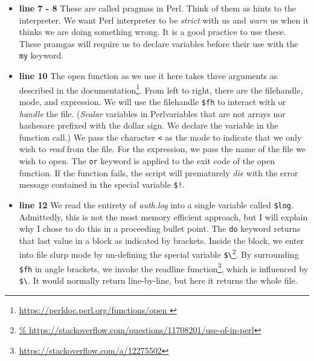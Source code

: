 \documentclass{article}
\begin{document}
\begin{itemize}[leftmargin=*]

	\item

		\textbf{line 7 - 8} These are called pragmas in Perl. Think of
		them as hints to the interpreter. We want Perl interpreter to be
		\emph{strict} with us and \emph{warn} us when it thinks we are
		doing something wrong. It is a good practice to use these.
		These pramgas will require us to declare variables before their
		use with the \verb|my| keyword.

	\item

		\textbf{line 10} The open function as we use it here takes three
		arguments as described in the
		documentation\footnote{%
			\url{https://perldoc.perl.org/functions/open }
		}.
		From left to right, there are the filehandle, mode, and
		expression.  We will use the filehandle \verb|$fh| to interact
		with or \emph{handle} the file. (\emph{Scalar} variables in
		Perl\textemdash variables that are not arrays nor
		hashes\textemdash are prefixed with the dollar sign. We declare
		the variable in the function call.) We pass the character
		\verb|<| as the mode to indicate that we only wish to
		\emph{read} from the file.  For the expression, we pass the name
		of the file we wish to open. The \verb|or| keyword is applied to
		the exit code of the open function. If the function fails, the
		script will prematurely \emph{die} with the error message
		contained in the special variable \verb|$!|.

	\item

		\textbf{line 12} We read the entirety of \emph{auth.log} into a
		single variable called \verb|$log|. Admittedly, this is not the
		most memory efficient approach, but I will explain why I chose
		to do this in a proceeding bullet point. The \verb|do| keyword
		returns that last value in a block as indicated by brackets.
		Inside the block, we enter into file slurp mode by un-defining
		the special variable
		\verb|$\|\footnote{\url{%
		https://stackoverflow.com/questions/11708201/use-of-in-perl}}.
		By surrounding \verb|$fh| in angle brackets, we invoke the
		readline
		function\footnote{\url{https://stackoverflow.com/a/12275502}},
		which is influenced by \verb|$\|. It would normally return
		line-by-line, but here it returns the whole file.



\end{itemize}
\end{document}
